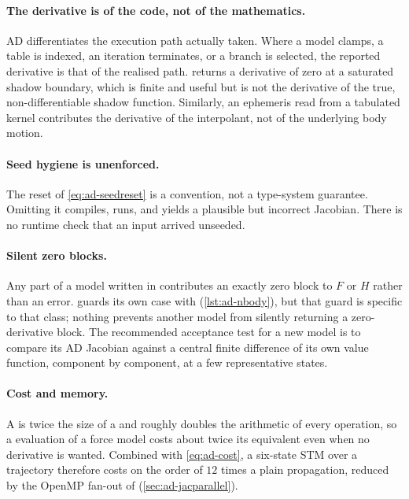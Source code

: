 \paragraph{The derivative is of the code, not of the mathematics.}
AD differentiates the execution path actually taken. Where a model clamps, a
table is indexed, an iteration terminates, or a branch is selected, the
reported derivative is that of the realised path.  returns a
derivative of zero at a saturated shadow boundary, which is finite and useful
but is not the derivative of the true, non-differentiable shadow function.
Similarly, an ephemeris read from a tabulated kernel contributes the
derivative of the interpolant, not of the underlying body motion.

\paragraph{Seed hygiene is unenforced.}
The  reset of \cref{eq:ad-seedreset} is a convention, not
a type-system guarantee. Omitting it compiles, runs, and yields a plausible
but incorrect Jacobian. There is no runtime check that an input arrived
unseeded.

\paragraph{Silent zero blocks.}
Any part of a model written in  contributes an exactly zero block
to $F$ or $H$ rather than an error.  guards its own case
with  (\cref{lst:ad-nbody}), but that guard
is specific to that class; nothing prevents another model from silently
returning a zero-derivative block. The recommended acceptance test for a new
model is to compare its AD Jacobian against a central finite difference of its
own value function, component by component, at a few representative states.

\paragraph{Cost and memory.}
A  is twice the size of a  and roughly doubles the
arithmetic of every operation, so a  evaluation of a force model
costs about twice its  equivalent even when no derivative is
wanted. Combined with \cref{eq:ad-cost}, a six-state STM over a trajectory
therefore costs on the order of $12$ times a plain  propagation,
reduced by the OpenMP fan-out of 
(\cref{sec:ad-jacparallel}).

